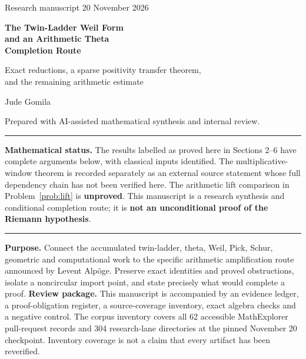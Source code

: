 \documentclass[11pt,letterpaper]{article}
\theoremstyle{definition}
\theoremstyle{remark}
\numberwithin{equation}{section}
\begin{document}
\hypersetup{pageanchor=false}
\begin{titlepage}
\vspace*{1.1cm}
{\Large\color{blue!45!black}Research manuscript \hfill 20 November 2026\par}
\vspace{1.1cm}
{\huge\bfseries The Twin-Ladder Weil Form\\[0.3em]and an Arithmetic Theta\\[0.3em]Completion Route\par}
\vspace{0.65cm}
{\Large Exact reductions, a sparse positivity transfer theorem,\\and the remaining arithmetic estimate\par}
\vspace{0.9cm}
{\Large Jude Gomila\par}
{\small Prepared with AI-assisted mathematical synthesis and internal review.\par}
\vspace{0.9cm}
\hrule
\vspace{0.35cm}
\textbf{Mathematical status.} The results labelled as proved here in Sections 2--6 have complete arguments below, with classical inputs identified. The multiplicative-window theorem is recorded separately as an external source statement whose full dependency chain has not been verified here. The arithmetic lift comparison in Problem~\ref{prob:lift} is \textbf{unproved}. This manuscript is a research synthesis and conditional completion route; it is \textbf{not an unconditional proof of the Riemann hypothesis}.
\vspace{0.35cm}
\hrule
\vspace{0.65cm}
\textbf{Purpose.} Connect the accumulated twin-ladder, theta, Weil, Pick, Schur, geometric and computational work to the specific arithmetic amplification route announced by Levent Alp\"oge. Preserve exact identities and proved obstructions, isolate a noncircular import point, and state precisely what would complete a proof.
\vfill
\textbf{Review package.} This manuscript is accompanied by an evidence ledger, a proof-obligation register, a source-coverage inventory, exact algebra checks and a negative control. The corpus inventory covers all 62 accessible MathExplorer pull-request records and 304 research-lane directories at the pinned November 20 checkpoint. Inventory coverage is not a claim that every artifact has been reverified.
\end{titlepage}
\hypersetup{pageanchor=true}
\end{document}
